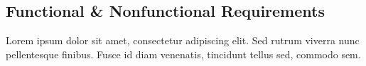 \subsection*{Functional \& Nonfunctional Requirements} %
Lorem ipsum dolor sit amet, consectetur adipiscing elit. Sed rutrum viverra nunc pellentesque finibus. Fusce id diam venenatis, tincidunt tellus sed, commodo sem.


